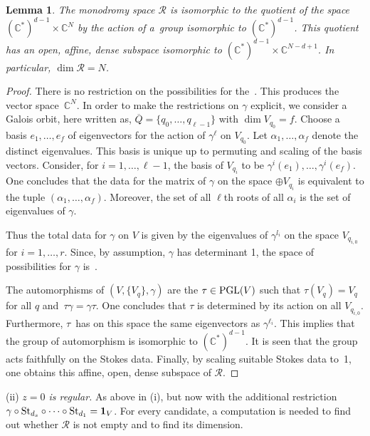 \documentclass[10pt,a4paper]{amsart}
\numberwithin{equation}{section}
\newtheorem{Lemma}[Theorem]{Lemma}
\begin{document}
\begin{Lemma} \label{lemma01} The monodromy space $\mathcal{R}$ is isomorphic to the quotient of the space $(\mathbb{C}^*)^{d-1}\times \mathbb{C}^N$ by the
 action of a~group isomorphic to $(\mathbb{C}^*)^{d-1}$. This quotient has an open, affine, dense subspace
 isomorphic to $(\mathbb{C}^*)^{d-1}\times \mathbb{C}^{N-d+1}$. In particular, $\dim \mathcal{R}=N$.
\end{Lemma}
\begin{proof} There is no restriction on the possibilities for the~. This produces the vector space~$\mathbb{C}^N$.
In order to make the restrictions on $\gamma$ explicit, we consider a Galois orbit, here written as,
$\overline{Q}=\{q_0,\dots ,q_{\ell -1}\}$ with $\dim V_{q_0}=f$. Choose a basis
$e_{1},\dots, e_{f}$ of eigenvectors for the action of $\gamma^\ell$ on $V_{q_0}$. Let $\alpha_1,\dots ,\alpha_f$ denote the
distinct eigenvalues. This basis is unique up to permuting and scaling of the basis vectors. Consider, for $i=1,\dots, \ell -1$, the basis of $V_{q_i}$ to be $\gamma ^i(e_1),\dots , \gamma ^i(e_f)$. One concludes that the data for the matrix of $\gamma$
on the space $\oplus V_{q_i}$ is equivalent to the tuple $(\alpha_1,\dots ,\alpha_f)$. Moreover, the set of all $\ell$th roots of all $\alpha _i$ is the set of eigenvalues of $\gamma$.

Thus the total data for $\gamma$ on $V$ is given by the eigenvalues of $\gamma^{l_i}$ on the space $ V_{q_{i,0}}$ for $i=1,\dots ,r$.
 Since, by assumption, $\gamma$ has determinant 1, the space of possibilities for $\gamma$ is~.


The automorphisms of $(V,\{V_q\},\gamma)$ are the $\tau \in {\rm PGL}(V)$ such that $\tau(V_q)=V_q$ for all $q$ and~${\tau \gamma=\gamma \tau}$. One concludes that $\tau$ is determined by its action on all $V_{q_{i,0}}$. Furthermore,
$\tau$~has on this space the same eigenvectors as $\gamma ^{\ell_i}$. This implies that the group of automorphism
is isomorphic to $(\mathbb{C}^*)^{d-1}$. It is seen that the group acts faithfully on the Stokes data. Finally, by scaling
suitable Stokes data to~1, one obtains this affine, open, dense subspace of $\mathcal{R}$.
\end{proof}

 (ii) {\it $z=0$ is regular.} As above in (i), but now with the additional restriction $\gamma \circ {\rm St}_{d_s}\circ \dots \circ {\rm St}_{d_1}=\mathbf{1}_V$. For every candidate, a computation is needed to find out whether $\mathcal{R}$ is not empty and to find its dimension.
\end{document}
